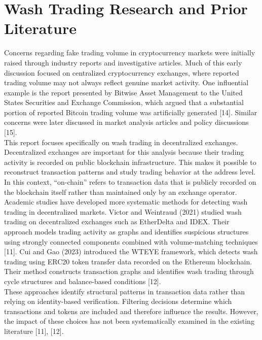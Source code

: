\documentclass[language=english,thesis=bachelor,nosecondtitle,onesided,faculty=cb]{hsmw-thesis}
\begin{document}
	\section{Wash Trading Research and Prior Literature}
Concerns regarding fake trading volume in cryptocurrency markets were initially raised through industry reports and investigative articles. Much of this early discussion focused on centralized cryptocurrency exchanges, where reported trading volume may not always reflect genuine market activity. One influential example is the report presented by Bitwise Asset Management to the United States Securities and Exchange Commission, which argued that a substantial portion of reported Bitcoin trading volume was artificially generated [14]. Similar concerns were later discussed in market analysis articles and policy discussions [15].\\
This report focuses specifically on wash trading in decentralized exchanges. Decentralized exchanges are important for this analysis because their trading activity is recorded on public blockchain infrastructure. This makes it possible to reconstruct transaction patterns and study trading behavior at the address level. In this context, “on-chain” refers to transaction data that is publicly recorded on the blockchain itself rather than maintained only by an exchange operator.\\
Academic studies have developed more systematic methods for detecting wash trading in decentralized markets. Victor and Weintraud (2021) studied wash trading on decentralized exchanges such as EtherDelta and IDEX. Their approach models trading activity as graphs and identifies suspicious structures using strongly connected components combined with volume-matching techniques [11].
Cui and Gao (2023) introduced the WTEYE framework, which detects wash trading using ERC20 token transfer data recorded on the Ethereum blockchain. Their method constructs transaction graphs and identifies wash trading through cycle structures and balance-based conditions [12].\\
These approaches identify structural patterns in transaction data rather than relying on identity-based verification. Filtering decisions determine which transactions and tokens are included and therefore influence the results. However, the impact of these choices has not been systematically examined in the existing literature [11], [12].
\end{document}
